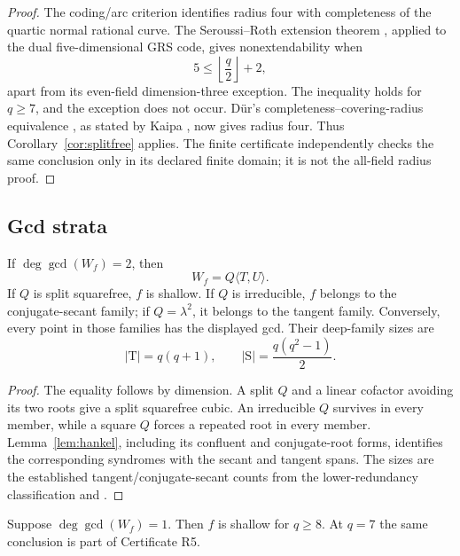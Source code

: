 \begin{proof}
The coding/arc criterion identifies radius four with completeness of
the quartic normal rational curve. The Seroussi--Roth extension theorem
\cite[Thm.~1]{SeroussiRoth1986}, applied to the dual five-dimensional
GRS code, gives nonextendability when
\[
       5\leq\left\lfloor\frac q2\right\rfloor+2,
\]
apart from its even-field dimension-three exception. The inequality
holds for \(q\geq7\), and the exception does not occur. Dür's
completeness--covering-radius equivalence \cite{Dur1994}, as stated by
Kaipa \cite[Sec.~IV and Prop.~4(1)]{Kaipa2017}, now gives radius four. Thus
Corollary~\ref{cor:splitfree} applies.  The finite certificate
independently checks the same conclusion only in its declared finite
domain; it is not the all-field radius proof.
\end{proof}

\subsection{Gcd strata}

\begin{proposition}\label{prop:r5-gcd2}%
%
%
If $\deg\gcd(W_f)=2$, then
\[
       W_f=Q\langle T,U\rangle.
\]
If $Q$ is split squarefree, $f$ is shallow.  If $Q$ is irreducible,
$f$ belongs to the conjugate-secant family; if $Q=\lambda^2$, it
belongs to the tangent family.  Conversely, every point in those
families has the displayed gcd.  Their deep-family sizes are
\[
       |\mathrm T|=q(q+1),\qquad
       |\mathrm S|=\frac{q(q^2-1)}2.
\]
\end{proposition}

\begin{proof}
The equality follows by dimension.  A split $Q$ and a linear cofactor
avoiding its two roots give a split squarefree cubic.  An irreducible
$Q$ survives in every member, while a square $Q$ forces a repeated
root in every member.  Lemma~\ref{lem:hankel}, including its confluent
and conjugate-root forms, identifies the corresponding syndromes with
the secant and tangent spans.  The sizes are the established
tangent/conjugate-secant counts from the lower-redundancy
classification
\cite[Prop.~1]{Kaipa2017} and \cite[Thms.~I.4--I.6]{ZWK2020}.
\end{proof}

\begin{proposition}\label{prop:r5-gcd1}%
%
Suppose $\deg\gcd(W_f)=1$.  Then $f$ is shallow for $q\geq8$.  At
$q=7$ the same conclusion is part of Certificate R5.
\end{proposition}


